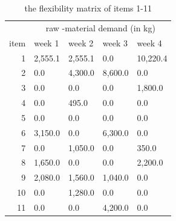 \documentclass[preprint, 3p,
authoryear]{elsarticle} %
\begin{document}
\begin{table}[!h]

\caption{\label{tab:unnamed-chunk-6}the flexibility matrix of items 1-11}
\centering
\begin{tabular}[t]{r|l|l|l|l}
\hline
\multicolumn{1}{c|}{ } & \multicolumn{4}{c}{raw -material demand (in kg)} \\
\cline{2-5}
item & week 1 & week 2 & week 3 & week 4\\
\hline
1 & 2,555.1 & 2,555.1 & 0.0 & 10,220.4\\
\hline
2 & 0.0 & 4,300.0 & 8,600.0 & 0.0\\
\hline
3 & 0.0 & 0.0 & 0.0 & 1,800.0\\
\hline
4 & 0.0 & 495.0 & 0.0 & 0.0\\
\hline
5 & 0.0 & 0.0 & 0.0 & 0.0\\
\hline
6 & 3,150.0 & 0.0 & 6,300.0 & 0.0\\
\hline
7 & 0.0 & 1,050.0 & 0.0 & 350.0\\
\hline
8 & 1,650.0 & 0.0 & 0.0 & 2,200.0\\
\hline
9 & 2,080.0 & 1,560.0 & 1,040.0 & 0.0\\
\hline
10 & 0.0 & 1,280.0 & 0.0 & 0.0\\
\hline
11 & 0.0 & 0.0 & 4,200.0 & 0.0\\
\hline
\end{tabular}
\end{table}

\newpage
\end{document}
